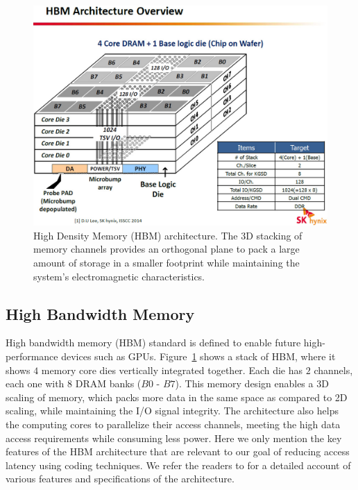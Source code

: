\begin{figure}[t!]
\centering
\includegraphics[width=0.99\linewidth]{figures/sk_hynix_hbm_dram_3.jpg} 
\caption{High Density Memory (HBM) architecture\protect\footnotemark. The 3D stacking of memory channels provides an orthogonal plane to pack a large amount of storage in a smaller footprint while maintaining the system's electromagnetic characteristics.}
\label{fig:hbm-arch}
\end{figure}


\subsection{High Bandwidth Memory}
\label{sec:hbm}

High bandwidth memory (HBM) standard is defined to enable future high-performance devices such as GPUs. Figure~\ref{fig:hbm-arch} shows a stack of HBM, where it shows $4$ memory core dies vertically integrated together. Each die has $2$ channels, each one with $8$ DRAM banks ($B0$ - $B7$). This memory design enables a 3D scaling of memory, which packs more data in the same space as compared to 2D scaling, while maintaining the I/O signal integrity. The architecture also helps the computing cores to parallelize their access channels, meeting the high data access requirements while consuming less power. Here we only mention the key features of the HBM architecture that are relevant to our goal of reducing access latency using coding techniques. We refer the readers to \cite{kim2014hbm} for a detailed account of various features and specifications of the architecture. 

